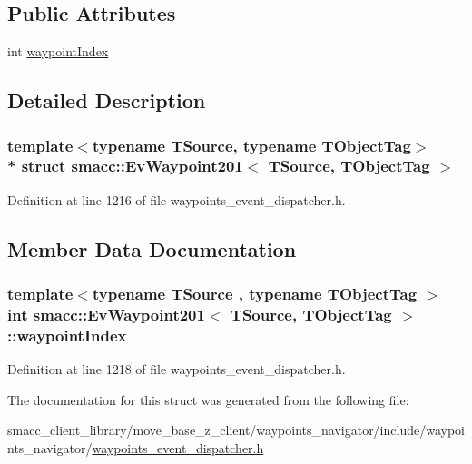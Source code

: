 \subsection*{Public Attributes}
\begin{DoxyCompactItemize}
\item 
int \hyperlink{structsmacc_1_1EvWaypoint201_af577262817427ccbf13612931416db3d}{waypoint\+Index}
\end{DoxyCompactItemize}


\subsection{Detailed Description}
\subsubsection*{template$<$typename T\+Source, typename T\+Object\+Tag$>$\\*
struct smacc\+::\+Ev\+Waypoint201$<$ T\+Source, T\+Object\+Tag $>$}



Definition at line 1216 of file waypoints\+\_\+event\+\_\+dispatcher.\+h.



\subsection{Member Data Documentation}
\subsubsection[{\texorpdfstring{waypoint\+Index}{waypointIndex}}]{\setlength{\rightskip}{0pt plus 5cm}template$<$typename T\+Source , typename T\+Object\+Tag $>$ int {\bf smacc\+::\+Ev\+Waypoint201}$<$ T\+Source, T\+Object\+Tag $>$\+::waypoint\+Index}\hypertarget{structsmacc_1_1EvWaypoint201_af577262817427ccbf13612931416db3d}{}\label{structsmacc_1_1EvWaypoint201_af577262817427ccbf13612931416db3d}


Definition at line 1218 of file waypoints\+\_\+event\+\_\+dispatcher.\+h.



The documentation for this struct was generated from the following file\+:\begin{DoxyCompactItemize}
\item 
smacc\+\_\+client\+\_\+library/move\+\_\+base\+\_\+z\+\_\+client/waypoints\+\_\+navigator/include/waypoints\+\_\+navigator/\hyperlink{waypoints__event__dispatcher_8h}{waypoints\+\_\+event\+\_\+dispatcher.\+h}\end{DoxyCompactItemize}
